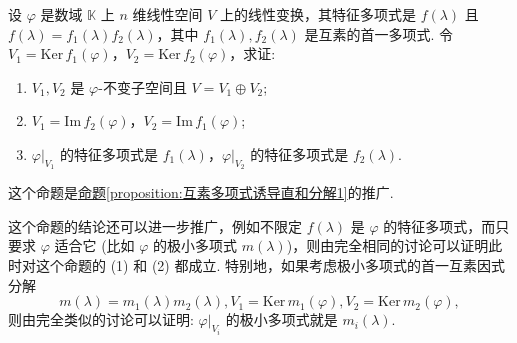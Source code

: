 \documentclass[../../main.tex]{subfiles}
\begin{document}
\begin{proposition}\label{proposition:Cayley-Hamilton定理诱导直和分解(互素多项式命题推广)}
设 $\varphi$ 是数域 $\mathbb{K}$ 上 $n$ 维线性空间 $V$ 上的线性变换，其特征多项式是 $f(\lambda)$ 且 $f(\lambda)=f_1(\lambda)f_2(\lambda)$，其中 $f_1(\lambda),f_2(\lambda)$ 是互素的首一多项式. 令 $V_1 = \mathrm{Ker}\,f_1(\varphi)$，$V_2 = \mathrm{Ker}\,f_2(\varphi)$，求证:
\begin{enumerate}[(1)]
\item  $V_1,V_2$ 是 $\varphi$-不变子空间且 $V = V_1\oplus V_2$;

\item $V_1 = \mathrm{Im}\,f_2(\varphi)$，$V_2 = \mathrm{Im}\,f_1(\varphi)$;

\item $\varphi|_{V_1}$ 的特征多项式是 $f_1(\lambda)$，$\varphi|_{V_2}$ 的特征多项式是 $f_2(\lambda)$.
\end{enumerate}
\end{proposition}
\begin{note}
这个命题是\hyperref[proposition:互素多项式诱导直和分解1]{命题\ref{proposition:互素多项式诱导直和分解1}}的推广.

这个命题的结论还可以进一步推广，例如不限定 $f(\lambda)$ 是 $\varphi$ 的特征多项式，而只要求 $\varphi$ 适合它 (比如 $\varphi$ 的极小多项式 $m(\lambda)$)，则由完全相同的讨论可以证明此时对这个命题的 (1) 和 (2) 都成立. 特别地，如果考虑极小多项式的首一互素因式分解
\[m(\lambda)=m_1(\lambda)m_2(\lambda), V_1 = \mathrm{Ker}\,m_1(\varphi), V_2 = \mathrm{Ker}\,m_2(\varphi),\]
则由完全类似的讨论可以证明: $\varphi|_{V_i}$ 的极小多项式就是 $m_i(\lambda)$. 
\end{note}
\end{document}

